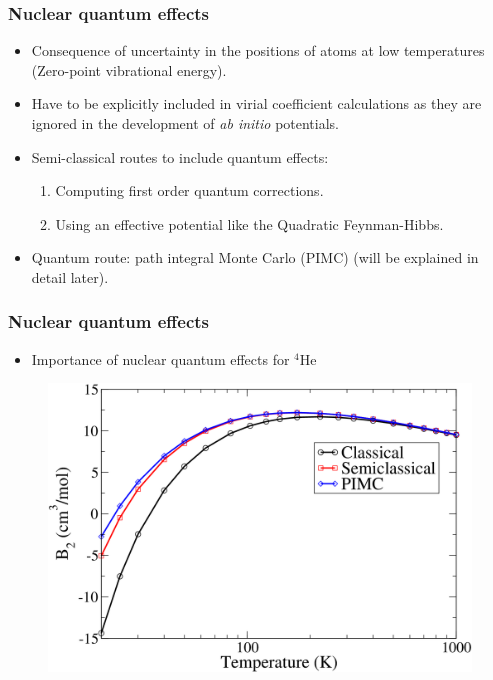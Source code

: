 \documentclass[xcolor=svgnames]{beamer}
\DeclareRobustCommand{\abinitio}[0]{\emph{ab initio}}
\begin{document}
        \begin{frame}
            \frametitle{Nuclear quantum effects}
            \begin{itemize}
                \justifying
                \item Consequence of uncertainty in the positions of atoms at low temperatures (Zero-point vibrational energy).
                \item Have to be explicitly included in virial coefficient calculations as they are ignored in the development of \abinitio{} potentials.
                \item Semi-classical routes to include quantum effects:
                    \begin{enumerate}
                        \item Computing first order quantum corrections.
                        \item Using an effective potential like the Quadratic Feynman-Hibbs.
                    \end{enumerate}
                \item Quantum route: path integral Monte Carlo (PIMC) (will be explained in detail later).
            \end{itemize}
        \end{frame}
        \begin{frame}
            \frametitle{Nuclear quantum effects}
            \begin{itemize}
                \item Importance of nuclear quantum effects for $^4$He
            \end{itemize}
            \begin{figure}
            \centering
            \includegraphics[scale=0.17,keepaspectratio]{B2-Kate.png}
            \end{figure}
        \end{frame}
	
\end{document}
